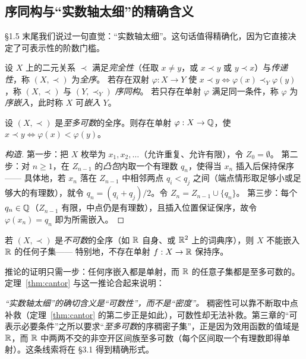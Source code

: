\subsection{序同构与“实数轴太细”的精确含义}

§1.5 末尾我们说过一句直觉：“实数轴太细”。这句话值得精确化，因为它直接决定了可表示性的阶数门槛。

\begin{definition}
设 $X$ 上的二元关系 $\prec$ 满足\emph{完全性}（任取 $x\ne y$，或 $x\prec y$ 或 $y\prec x$）与\emph{传递性}，称 $(X,\prec)$ 为\emph{全序}。
若存在双射 $\varphi:X\to Y$ 使 $x\prec y\iff\varphi(x)\prec_{Y}\varphi(y)$，称 $(X,\prec)$ 与 $(Y,\prec_{Y})$ \emph{序同构}。
若只存在单射 $\varphi$ 满足同一条件，称 $\varphi$ 为\emph{序嵌入}，此时称 $X$ 可\emph{嵌入} $Y$。
\end{definition}

\begin{theorem}\label{thm:cantor}
设 $(X,\prec)$ 是\emph{至多可数}的全序。则存在单射 $\varphi:X\to\mathbb{Q}$，使 $x\prec y\iff\varphi(x)<\varphi(y)$。
\end{theorem}

\begin{proof}[构造]
第一步：把 $X$ 枚举为 $x_{1},x_{2},\dots$（允许重复、允许有限），令 $Z_{0}=\emptyset$。
第二步：对 $n\ge 1$，在 $Z_{n-1}$ 的\emph{凸包}内取一个有理数 $q_{n}$，使得当 $x_{n}$ 插入后保持保序——
具体地，若 $x_{n}$ 落在 $Z_{n-1}$ 中相邻两点 $q_{i}<q_{j}$ 之间（端点情形取足够小或足够大的有理数），就令
$q_{n}=(q_{i}+q_{j})/2$。令 $Z_{n}=Z_{n-1}\cup\{q_{n}\}$。
第三步：每个 $q_{n}\in\mathbb{Q}$（$Z_{n-1}$ 有限，中点仍是有理数），且插入位置保证保序，故令 $\varphi(x_{n})=q_{n}$ 即为所需嵌入。
\end{proof}

\begin{corollary}
若 $(X,\prec)$ 是\emph{不可数}的全序（如 $\mathbb{R}$ 自身、或 $\mathbb{R}^{2}$ 上的词典序），则 $X$ 不能嵌入 $\mathbb{R}$ 的任何子集——
特别地，不存在单射 $f:X\to\mathbb{R}$ 保持序。
\end{corollary}

推论的证明只需一步：任何序嵌入都是单射，而 $\mathbb{R}$ 的任意子集都是至多可数的。定理~\ref{thm:cantor} 与这一推论合起来说明：

\emph{“实数轴太细”的确切含义是“可数性”，而不是“密度”。} 稠密性可以靠不断取中点补救（定理~\ref{thm:cantor} 的第二步正是如此），可数性却无法补救。第三章的“可表示必要条件”之所以要求“\emph{至多可数}的序稠密子集”，正是因为效用函数的值域是 $\mathbb{R}$，而 $\mathbb{R}$ 中两两不交的非空开区间族至多可数（每个区间取一个有理数即得单射）。这条线索将在 \S3.1 得到精确形式。

